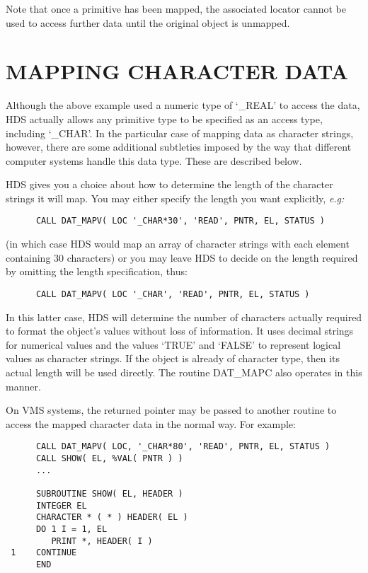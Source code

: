 Note that once a primitive has been mapped, the associated locator cannot be
used to access further data until the original object is unmapped.

\section{MAPPING CHARACTER DATA}
\label{sect:charmapping}

Although the above example used a numeric type of `\_REAL' to access the data,
HDS actually allows any primitive type to be specified as an access type,
including `\_CHAR'. In the particular case of mapping data as character
strings, however, there are some additional subtleties imposed by the way that
different computer systems handle this data type. These are described below.

HDS gives you a choice about how to determine the length of the character
strings it will map. You may either specify the length you want explicitly,
{\em e.g:}

\small
\begin{verbatim}
      CALL DAT_MAPV( LOC '_CHAR*30', 'READ', PNTR, EL, STATUS )
\end{verbatim}
\normalsize

(in which case HDS would map an array of character strings with each element 
containing 30 characters) or you may leave HDS to decide on the length
required by omitting the length specification, thus:

\small
\begin{verbatim}
      CALL DAT_MAPV( LOC '_CHAR', 'READ', PNTR, EL, STATUS )
\end{verbatim}
\normalsize

In this latter case, HDS will determine the number of characters actually
required to format the object's values without loss of information. It uses
decimal strings for numerical values and the values `TRUE' and `FALSE' to
represent logical values as character strings. If the object is already of
character type, then its actual length will be used directly. The routine
DAT\_MAPC also operates in this manner.

On VMS systems, the returned pointer may be passed to another routine to access
the mapped character data in the normal way. For example:

\small
\begin{verbatim}
      CALL DAT_MAPV( LOC, '_CHAR*80', 'READ', PNTR, EL, STATUS )
      CALL SHOW( EL, %VAL( PNTR ) )
      ...

      SUBROUTINE SHOW( EL, HEADER )
      INTEGER EL
      CHARACTER * ( * ) HEADER( EL )
      DO 1 I = 1, EL
         PRINT *, HEADER( I )
 1    CONTINUE
      END
\end{verbatim}
\normalsize

